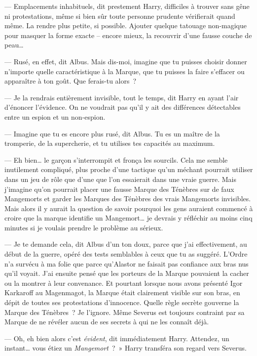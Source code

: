 --- Emplacements inhabituels, dit prestement Harry, difficiles à trouver sans gêne ni protestations, même si bien sûr toute personne prudente vérifierait quand même.
La rendre plus petite, si possible.
Ajouter quelque tatouage non-magique pour masquer la forme exacte -- encore mieux, la recouvrir d'une fausse couche de peau…

--- Rusé, en effet, dit Albus.
Mais dis-moi, imagine que tu puisses choisir donner n'importe quelle caractéristique à la Marque, que tu puisses la faire s'effacer ou apparaître à ton goût.
Que ferais-tu alors~?

--- Je la rendrais entièrement invisible, tout le temps, dit Harry en ayant l'air d'énoncer l'évidence.
On ne voudrait pas qu'il y ait des différences détectables entre un espion et un non-espion.

--- Imagine que tu es encore plus rusé, dit Albus.
Tu es un maître de la tromperie, de la supercherie, et tu utilises tes capacités au maximum.

--- Eh bien… le garçon s'interrompit et fronça les sourcils.
Cela me semble inutilement compliqué, plus proche d'une tactique qu'un méchant pourrait utiliser dans un jeu de rôle que d'une que l'on essaierait dans une vraie guerre.
Mais j'imagine qu'on pourrait placer une fausse Marque des Ténèbres sur de faux Mangemorts et garder les Marques des Ténèbres des vrais Mangemorts invisibles.
Mais alors il y aurait la question de savoir pourquoi les gens auraient commencé à croire que la marque identifie un Mangemort… je devrais y réfléchir au moins cinq minutes si je voulais prendre le problème au sérieux.

--- Je te demande cela, dit Albus d'un ton doux, parce que j'ai effectivement, au début de la guerre, opéré des tests semblables à ceux que tu as suggéré.
L'Ordre n'a survécu à ma folie que parce qu'Alastor ne faisait pas confiance aux bras nus qu'il voyait.
J'ai ensuite pensé que les porteurs de la Marque pouvaient la cacher ou la montrer à leur convenance.
Et pourtant lorsque nous avons présenté Igor Karkaroff au Magenmagot, la Marque était clairement visible sur son bras, en dépit de toutes ses protestations d'innocence.
Quelle règle secrète gouverne la Marque des Ténèbres~?
Je l'ignore.
Même Severus est toujours contraint par sa Marque de ne révéler aucun de ses secrets à qui ne les connaît déjà.

--- Oh, eh bien alors c'est \emph{évident}, dit immédiatement Harry.
Attendez, un instant… vous étiez un \emph{Mangemort}~?~»
Harry transféra son regard vers Severus.

